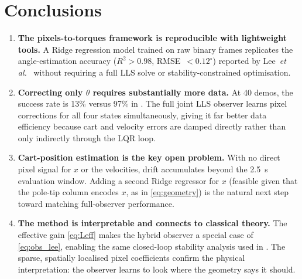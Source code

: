 \documentclass[conference]{IEEEtran}
\begin{document}
\section{Conclusions}
\label{sec:conclusions}

\begin{enumerate}

  \item \textbf{The pixels-to-torques framework is reproducible with
    lightweight tools.}
    A Ridge regression model trained on raw binary frames replicates the
    angle-estimation accuracy ($R^2>0.98$, RMSE~$<0.12^\circ$) reported
    by Lee~\emph{et al.}~\cite{lee2024} without requiring a full LLS solve
    or stability-constrained optimisation.

  \item \textbf{Correcting only $\theta$ requires substantially more data.}
    At 40 demos, the success rate is 13\% versus 97\% in \cite{lee2024}.
    The full joint LLS observer learns pixel corrections for all four states
    simultaneously, giving it far better data efficiency because cart and
    velocity errors are damped directly rather than only indirectly through
    the LQR loop.

  \item \textbf{Cart-position estimation is the key open problem.}
    With no direct pixel signal for $x$ or the velocities, drift accumulates
    beyond the 2.5~s evaluation window.  Adding a second Ridge regressor for
    $x$ (feasible given that the pole-tip column encodes $x$, as in
    \eqref{eq:geometry}) is the natural next step toward matching
    full-observer performance.

  \item \textbf{The method is interpretable and connects to classical theory.}
    The effective gain \eqref{eq:Leff} makes the hybrid observer a special
    case of \eqref{eq:obs_lee}, enabling the same closed-loop stability
    analysis used in \cite{lee2024}.  The sparse, spatially localised pixel
    coefficients confirm the physical interpretation: the observer learns to
    look where the geometry says it should.

\end{enumerate}
\end{document}
